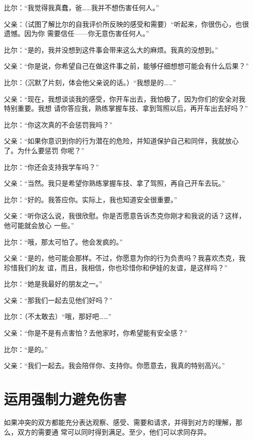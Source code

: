 \documentclass{ctexart}
\renewenvironment{quotation}{\setlength{\parskip}{0.5em}\setstretch{1.5}\kaishu\zihao{-5}\setlength{\parindent}{1em}}{\vspace{1em}}
\begin{document}
\begin{quotation}
	比尔：``我觉得我真蠢，爸\ldots\ldots 我并不想伤害任何人。''

	父亲：（试图了解比尔的自我评价所反映的感受和需要）``听起来，你很伤心，也很遗憾。因为你
	需要信任------你无意伤害任何人。''

	比尔：``是的，我并没想到这件事会带来这么大的麻烦。我真的没想到。''

	父亲：``你是说，你希望自己在做这件事之前，能够仔细想想可能会有什么后果？''

	比尔：（沉默了片刻，体会他父亲说的话。）``我想是的\ldots\ldots''

	父亲：``现在，我想谈谈我的感受，你开车出去，我怕极了，因为你们的安全对我特别重要。我想
	请你答应我，熟练掌握车技、拿到驾照以后，再开车出去好吗？''

	比尔：``你这次真的不会惩罚我吗？''

	父亲：``如果你意识到你的行为潜在的危险，并知道保护自己和同伴，我就放心了。为什么要惩罚
	你呢？''

	比尔：``你还会支持我学车吗？''

	父亲：``当然。我只是希望你熟练掌握车技、拿了驾照，再自己开车去玩。''

	比尔：``好的。我答应你。实际上，我也知道安全很重要。''

	父亲：``听你这么说，我很欣慰。你是否愿意告诉杰克你刚才和我说的话？这样，他可能就会放心
	一些。''

	比尔：``哦，那太可怕了。他会发疯的。''

	父亲：``是的，他可能会那样。不过，你愿意为你的行为负责吗？我喜欢杰克，我珍惜我们的友
	谊，而且，我相信，你也珍惜你和伊娃的友谊，是这样吗？''

	比尔：``她是我最好的朋友之一。''

	父亲：``那我们一起去见他们好吗？''

	比尔：（不太敢去）``哦，那好吧\ldots\ldots''

	父亲：``你是不是有点害怕？去他家时，你希望能有安全感？''

	比尔：``是的。''

	父亲：``我们一起去。我会陪伴你、支持你。你愿意去，我真的特别高兴。''
\end{quotation}

\section{运用强制力避免伤害}\label{sec:运用强制力避免伤害}

如果冲突的双方都能充分表达观察、感受、需要和请求，并得到对方的理解，那么，双方的需要通
常可以同时得到满足。至少，他们可以求同存异。
\end{document}

